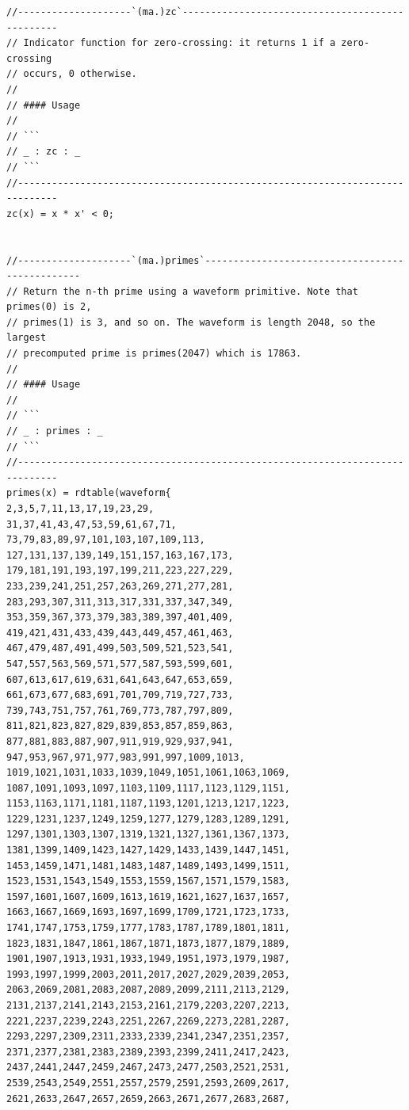 \documentclass{article}
\begin{document}
\begin{lstlisting}[caption=\texttt{maths.lib}]
//--------------------`(ma.)zc`------------------------------------------------
// Indicator function for zero-crossing: it returns 1 if a zero-crossing
// occurs, 0 otherwise.
//
// #### Usage
//
// ```
// _ : zc : _
// ```
//-----------------------------------------------------------------------------
zc(x) = x * x' < 0;


//--------------------`(ma.)primes`------------------------------------------------
// Return the n-th prime using a waveform primitive. Note that primes(0) is 2,
// primes(1) is 3, and so on. The waveform is length 2048, so the largest
// precomputed prime is primes(2047) which is 17863.
//
// #### Usage
//
// ```
// _ : primes : _
// ```
//-----------------------------------------------------------------------------
primes(x) = rdtable(waveform{
2,3,5,7,11,13,17,19,23,29,
31,37,41,43,47,53,59,61,67,71,
73,79,83,89,97,101,103,107,109,113,
127,131,137,139,149,151,157,163,167,173,
179,181,191,193,197,199,211,223,227,229,
233,239,241,251,257,263,269,271,277,281,
283,293,307,311,313,317,331,337,347,349,
353,359,367,373,379,383,389,397,401,409,
419,421,431,433,439,443,449,457,461,463,
467,479,487,491,499,503,509,521,523,541,
547,557,563,569,571,577,587,593,599,601,
607,613,617,619,631,641,643,647,653,659,
661,673,677,683,691,701,709,719,727,733,
739,743,751,757,761,769,773,787,797,809,
811,821,823,827,829,839,853,857,859,863,
877,881,883,887,907,911,919,929,937,941,
947,953,967,971,977,983,991,997,1009,1013,
1019,1021,1031,1033,1039,1049,1051,1061,1063,1069,
1087,1091,1093,1097,1103,1109,1117,1123,1129,1151,
1153,1163,1171,1181,1187,1193,1201,1213,1217,1223,
1229,1231,1237,1249,1259,1277,1279,1283,1289,1291,
1297,1301,1303,1307,1319,1321,1327,1361,1367,1373,
1381,1399,1409,1423,1427,1429,1433,1439,1447,1451,
1453,1459,1471,1481,1483,1487,1489,1493,1499,1511,
1523,1531,1543,1549,1553,1559,1567,1571,1579,1583,
1597,1601,1607,1609,1613,1619,1621,1627,1637,1657,
1663,1667,1669,1693,1697,1699,1709,1721,1723,1733,
1741,1747,1753,1759,1777,1783,1787,1789,1801,1811,
1823,1831,1847,1861,1867,1871,1873,1877,1879,1889,
1901,1907,1913,1931,1933,1949,1951,1973,1979,1987,
1993,1997,1999,2003,2011,2017,2027,2029,2039,2053,
2063,2069,2081,2083,2087,2089,2099,2111,2113,2129,
2131,2137,2141,2143,2153,2161,2179,2203,2207,2213,
2221,2237,2239,2243,2251,2267,2269,2273,2281,2287,
2293,2297,2309,2311,2333,2339,2341,2347,2351,2357,
2371,2377,2381,2383,2389,2393,2399,2411,2417,2423,
2437,2441,2447,2459,2467,2473,2477,2503,2521,2531,
2539,2543,2549,2551,2557,2579,2591,2593,2609,2617,
2621,2633,2647,2657,2659,2663,2671,2677,2683,2687,

\end{lstlisting}
\end{document}
